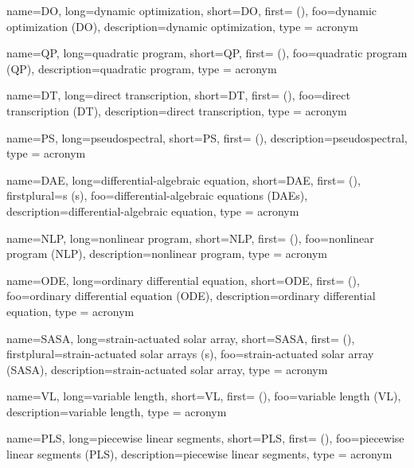 {
	name={DO},
	long={dynamic optimization},
	short={DO},
	first={} (),
	foo={dynamic optimization (DO)},
	description={dynamic optimization},
	type = acronym
}

{
	name={QP},
	long={quadratic program},
	short={QP},
	first={} (),
	foo={quadratic program (QP)},
	description={quadratic program},
	type = acronym
}

{
	name={DT},
	long={direct transcription},
	short={DT},
	first={} (),
	foo={direct transcription (DT)},
	description={direct transcription},
	type = acronym
}

{
	name={PS},
	long={pseudospectral},
	short={PS},
	first={} (),
	description={pseudospectral},
	type = acronym
}

{
	name={DAE},
	long={differential-algebraic equation},
	short={DAE},
	first={} (),
	firstplural={s (s)},
	foo={differential-algebraic equations (DAEs)},
	description={differential-algebraic equation},
	type = acronym
}

{
	name={NLP},
	long={nonlinear program},
	short={NLP},
	first={} (),
	foo={nonlinear program (NLP)},
	description={nonlinear program},
	type = acronym
}

{
	name={ODE},
	long={ordinary differential equation},
	short={ODE},
	first={} (),
	foo={ordinary differential equation (ODE)},
	description={ordinary differential equation},
	type = acronym
}

{
	name={SASA},
	long={strain-actuated solar array},
	short={SASA},
	first={} (),
	firstplural={strain-actuated solar arrays (s)},
	foo={strain-actuated solar array (SASA)},
	description={strain-actuated solar array},
	type = acronym
}

{
	name={VL},
	long={variable length},
	short={VL},
	first={} (),
	foo={variable length (VL)},
	description={variable length},
	type = acronym
}

{
	name={PLS},
	long={piecewise linear segments},
	short={PLS},
	first={} (),
	foo={piecewise linear segments (PLS)},
	description={piecewise linear segments},
	type = acronym
}

